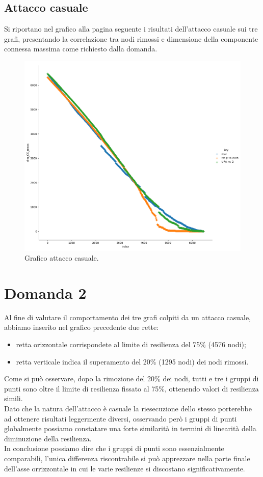 \documentclass{article}
\begin{document}
\subsection*{Attacco casuale}
	Si riportano nel grafico alla pagina seguente i risultati dell'attacco casuale sui tre grafi, presentando la correlazione tra nodi rimossi e dimensione della componente connessa massima come richiesto dalla domanda.
	\begin{figure}[H]
		\centering
		\includegraphics[width=1.0\textwidth]{figures/figure_random}
		\caption{Grafico attacco casuale.}
	\end{figure}

\newpage
\section*{Domanda 2}
Al fine di valutare il comportamento dei tre grafi colpiti da un attacco casuale, abbiamo inserito nel grafico precedente due rette:
\begin{itemize}
	\item retta orizzontale corrispondete al limite di resilienza del 75\% (4576 nodi);
	\item retta verticale indica il superamento del 20\% (1295 nodi) dei nodi rimossi. 
\end{itemize}
Come si può osservare, dopo la rimozione del 20\% dei nodi, tutti e tre i gruppi di punti sono oltre il limite di resilienza fissato al 75\%, ottenendo valori di resilienza simili.\\
Dato che la natura dell'attacco è casuale la riesecuzione dello stesso porterebbe ad ottenere risultati leggermente diversi, osservando però i gruppi di punti globalmente possiamo constatare una forte similarità in termini di linearità della diminuzione della resilienza.\\
In conclusione possiamo dire che i gruppi di punti sono essenzialmente comparabili, l'unica differenza riscontrabile si può apprezzare nella parte finale dell'asse orrizzontale in cui le varie resilienze si discostano significativamente.
\end{document}
